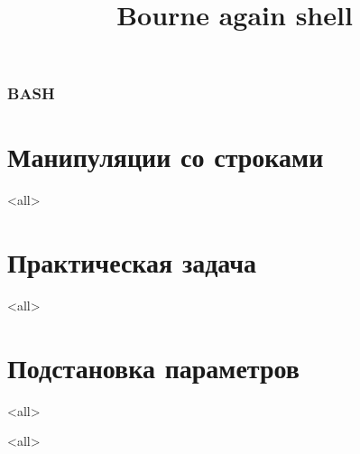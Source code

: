 
\title[bash]{Bourne again shell}




\begin{frame}
	\frametitle{BASH}
	\titlepage
	\vspace{-0.5cm}
	\begin{center}
	\end{center}
\end{frame}



\section{Манипуляции со строками}

\mode<all>{}

\section{Практическая задача}

\mode<all>{}

\section{Подстановка параметров}

\mode<all>{}

\mode<all>


